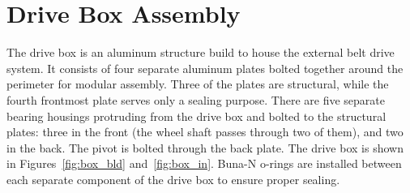 \section{Drive Box Assembly}

The drive box is an aluminum structure build to house the external belt drive system. It consists of four separate aluminum plates bolted together around the perimeter for modular assembly. Three of the plates are structural, while the fourth frontmost plate serves only a sealing purpose. There are five separate bearing housings protruding from the drive box and bolted to the structural plates: three in the front (the wheel shaft passes through two of them), and two in the back. The pivot is bolted through the back plate. The drive box is shown in Figures~\ref{fig:box_bld} and~\ref{fig:box_in}. Buna-N o-rings are installed between each separate component of the drive box to ensure proper sealing.

